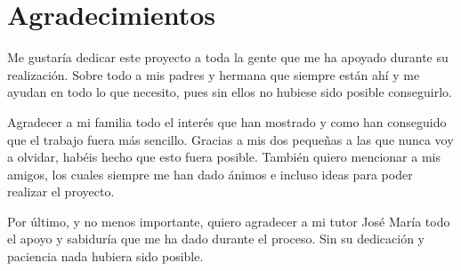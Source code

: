 \chapter*{Agradecimientos}

Me  gustaría  dedicar  este  proyecto  a  toda  la  gente  que  me  ha  apoyado  durante  su realización. Sobre todo  a mis padres  y hermana que siempre están ahí y me ayudan en todo lo que necesito, pues sin ellos no hubiese sido posible conseguirlo.

Agradecer a mi familia todo el interés que han mostrado y como han conseguido que el trabajo fuera más sencillo.  Gracias a mis dos pequeñas a las que nunca voy a olvidar, habéis hecho que esto fuera posible.
También quiero mencionar a mis amigos, los cuales siempre me han dado ánimos e incluso ideas para poder realizar el proyecto.

Por  último,  y  no  menos  importante,  quiero  agradecer  a  mi  tutor  José María todo el apoyo y sabiduría que me ha dado durante el proceso. Sin su dedicación y paciencia nada hubiera sido posible.
